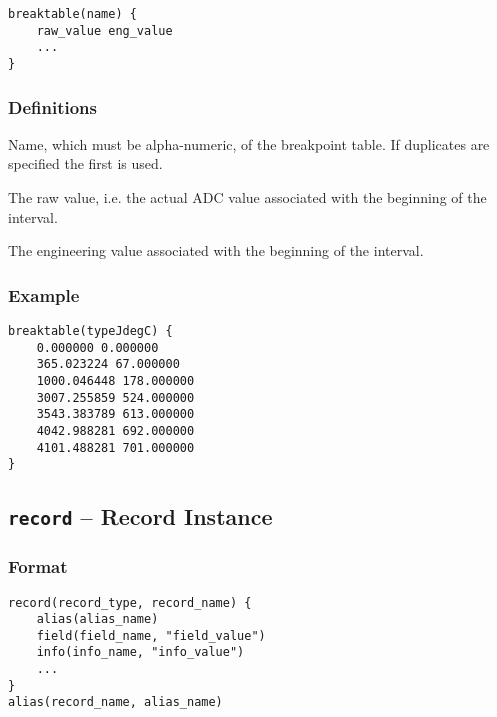 \begin{lstlisting}[language=dbd]
breaktable(name) {
    raw_value eng_value
    ...
}
\end{lstlisting}

\subsubsection{Definitions}

\begin{description}
\item [name] Name, which must be alpha-numeric, of the breakpoint table.
If duplicates are specified the first is used.

\item [raw\_value] The raw value, i.e. the actual ADC value associated with the beginning of the interval.

\item [eng\_value] The engineering value associated with the beginning of the interval.
\end{description}

\subsubsection{Example}

\begin{lstlisting}[language=dbd]
breaktable(typeJdegC) {
    0.000000 0.000000
    365.023224 67.000000
    1000.046448 178.000000
    3007.255859 524.000000
    3543.383789 613.000000
    4042.988281 692.000000
    4101.488281 701.000000
}
\end{lstlisting}

\subsection{\texttt{record} -- Record Instance}

\subsubsection{Format}

\begin{lstlisting}[language=dbd]
record(record_type, record_name) {
    alias(alias_name)
    field(field_name, "field_value")
    info(info_name, "info_value")
    ...
}
alias(record_name, alias_name)
\end{lstlisting}

